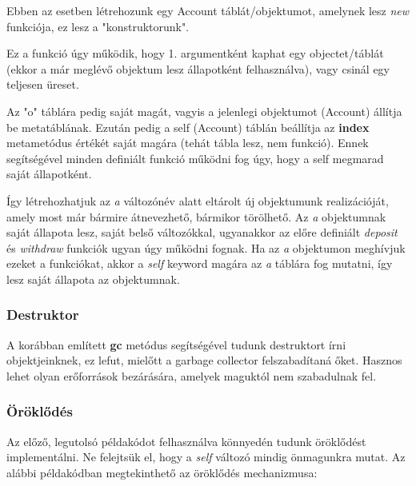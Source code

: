 Ebben az esetben létrehozunk egy Account táblát/objektumot, amelynek lesz \textit{new} funkciója, ez lesz a "konstruktorunk".

Ez a funkció úgy működik, hogy 1. argumentként kaphat egy objectet/táblát (ekkor a már meglévő objektum lesz állapotként felhasználva), vagy csinál egy teljesen üreset.

Az "o" táblára pedig saját magát, vagyis a jelenlegi objektumot (Account) állítja be metatáblának. Ezután pedig a self (Account) táblán beállítja az \detokenize{__}\textbf{index} metametódus értékét saját magára (tehát tábla lesz, nem funkció). Ennek segítségével minden definiált funkció működni fog úgy, hogy a self megmarad saját állapotként.

Így létrehozhatjuk az \textit{a} változónév alatt eltárolt új objektumunk realizációját, amely most már bármire átnevezhető, bármikor törölhető. Az \textit{a} objektumnak saját állapota lesz, saját belső változókkal, ugyanakkor az előre definiált \textit{deposit} és \textit{withdraw} funkciók ugyan úgy működni fognak. Ha az \textit{a} objektumon meghívjuk ezeket a funkciókat, akkor a \textit{self} keyword magára az \textit{a} táblára fog mutatni, így lesz saját állapota az objektumnak.

\subsubsection{Destruktor}
A korábban említett \detokenize{__}\textbf{gc} metódus segítségével tudunk destruktort írni objektjeinknek, ez lefut, mielőtt a garbage collector felszabadítaná őket. Hasznos lehet olyan erőforrások bezárására, amelyek maguktól nem szabadulnak fel.
\pagebreak
\subsubsection{Öröklődés}
Az előző, legutolsó példakódot felhasználva könnyedén tudunk öröklődést implementálni. Ne felejtsük el, hogy a \textit{self} változó mindig önmagunkra mutat. Az alábbi példakódban megtekinthető az öröklődés mechanizmusa:


